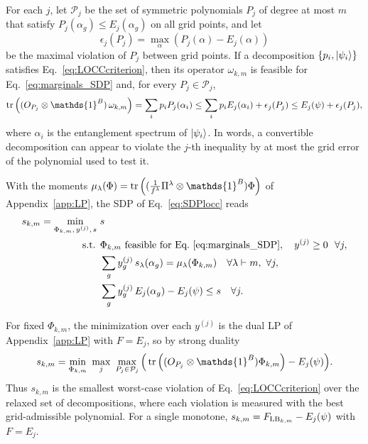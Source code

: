 \documentclass[aps,pra,twocolumn,showpacs,superscriptaddress,groupedaddress]{revtex4-2}
\newcommand{\one}[0]{\mathds{1}}
\renewcommand{\a}{\alpha}
\newcommand{\I}{\one}
\begin{document}
\begin{widetext}
For each $j$, let $\mathcal{P}_j$ be the set of symmetric polynomials $P_j$ of degree at most $m$ that satisfy $P_j(\a_g)\leq E_j(\a_g)$ on all grid points, and let
\begin{equation}
    \epsilon_j(P_j)=\max_{\a}\left(P_j(\a)-E_j(\a)\right)
\end{equation}
be the maximal violation of $P_j$ between grid points. If a decomposition $\{p_i,\ket{\psi_i}\}$ satisfies Eq.~\eqref{eq:LOCCcriterion}, then its operator $\omega_{k,m}$ is feasible for Eq.~\eqref{eq:marginals_SDP} and, for every $P_j\in\mathcal{P}_j$,
\begin{equation}\label{eq:LOCCnecessary}
    \tr\left((O_{P_j}\otimes\I^B)\,\omega_{k,m}\right)=\sum_ip_iP_j(\a_i)\leq\sum_ip_iE_j(\a_i)+\epsilon_j(P_j)\leq E_j(\psi)+\epsilon_j(P_j),
\end{equation}
where $\a_i$ is the entanglement spectrum of $\ket{\psi_i}$. In words, a convertible decomposition can appear to violate the $j$-th inequality by at most the grid error of the polynomial used to test it.

With the moments $\mu_\lambda(\Phi)=\tr\left((\tfrac{1}{f^\lambda}\Pi^\lambda\otimes\I^B)\Phi\right)$ of Appendix~\ref{app:LP}, the SDP of Eq.~\eqref{eq:SDPlocc} reads
\begin{align}\label{eq:LOCCsdp}
    s_{k,m}=\min_{\Phi_{k,m},\,y^{(j)},\,s}\ & s\\
    \text{s.t. }& \Phi_{k,m}\ \text{feasible for Eq.~\eqref{eq:marginals_SDP}},\quad y^{(j)}\geq0\ \ \forall j, \nonumber\\
    & \sum_g y^{(j)}_g\,s_\lambda(\a_g)=\mu_\lambda(\Phi_{k,m})\quad\forall\lambda\vdash m,\ \forall j, \nonumber\\
    & \sum_g y^{(j)}_g\,E_j(\a_g)-E_j(\psi)\leq s\quad\forall j. \nonumber
\end{align}

For fixed $\Phi_{k,m}$, the minimization over each $y^{(j)}$ is the dual LP of Appendix~\ref{app:LP} with $F=E_j$, so by strong duality
\begin{equation}\label{eq:LOCCminmax}
    s_{k,m}=\min_{\Phi_{k,m}}\ \max_{j}\ \max_{P_j\in\mathcal{P}_j}\Big(\tr\left((O_{P_j}\otimes\I^B)\Phi_{k,m}\right)-E_j(\psi)\Big).
\end{equation}
Thus $s_{k,m}$ is the smallest worst-case violation of Eq.~\eqref{eq:LOCCcriterion} over the relaxed set of decompositions, where each violation is measured with the best grid-admissible polynomial. For a single monotone, $s_{k,m}=F_{{\rm LB}_{k,m}}-E_j(\psi)$ with $F=E_j$.


\end{widetext}
\end{document}
